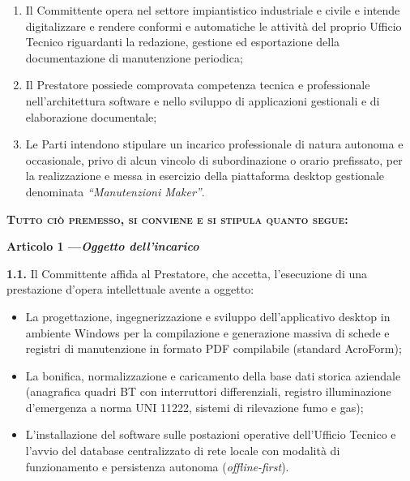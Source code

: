 \documentclass[11pt,a4paper]{article}
\newcommand{\articolo}[2]{%
  \vspace{0.8em}%
  {\noindent\bfseries Articolo #1 \quad---\quad \itshape #2}\par\vspace{0.2em}%
}
\begin{document}
\begin{enumerate}[label=\textbf{\Alph*.}]
  \item Il Committente opera nel settore impiantistico industriale e civile e intende digitalizzare e rendere conformi e automatiche le attività del proprio Ufficio Tecnico riguardanti la redazione, gestione ed esportazione della documentazione di manutenzione periodica;
  \item Il Prestatore possiede comprovata competenza tecnica e professionale nell'architettura software e nello sviluppo di applicazioni gestionali e di elaborazione documentale;
  \item Le Parti intendono stipulare un incarico professionale di natura autonoma e occasionale, privo di alcun vincolo di subordinazione o orario prefissato, per la realizzazione e messa in esercizio della piattaforma desktop gestionale denominata \emph{``Manutenzioni Maker''}.
\end{enumerate}

\vspace{0.6em}
\begin{center}
  \textbf{\scshape Tutto ciò premesso, si conviene e si stipula quanto segue:}
\end{center}
\vspace{0.4em}


\articolo{1}{Oggetto dell'incarico}
\textbf{1.1.} Il Committente affida al Prestatore, che accetta, l'esecuzione di una prestazione d'opera intellettuale avente a oggetto:
\begin{itemize}
  \item La progettazione, ingegnerizzazione e sviluppo dell'applicativo desktop in ambiente Windows per la compilazione e generazione massiva di schede e registri di manutenzione in formato PDF compilabile (standard AcroForm);
  \item La bonifica, normalizzazione e caricamento della base dati storica aziendale (anagrafica quadri BT con interruttori differenziali, registro illuminazione d'emergenza a norma UNI 11222, sistemi di rilevazione fumo e gas);
  \item L'installazione del software sulle postazioni operative dell'Ufficio Tecnico e l'avvio del database centralizzato di rete locale con modalità di funzionamento e persistenza autonoma (\emph{offline-first}).
\end{itemize}
\end{document}
